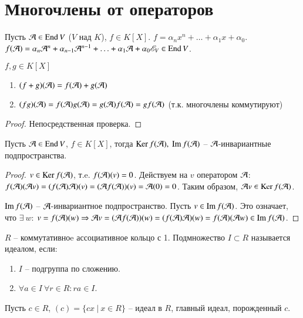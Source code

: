 \documentclass[main]{subfiles}
\begin{document}
\chapter{Многочлены от операторов}

Пусть $\mathcal{A} \in \operatorname{End} V$ ($V$ над $K$), $f \in K[X]$. $f = \alpha_n x^n + \ldots + \alpha_1 x + \alpha_0$.
$f(\mathcal{A}) = \alpha_n  {\mathcal{A}}^n + \alpha_{n-1} {\mathcal{A}}^{n-1} + \ldots + \alpha_1 \mathcal{A} + \alpha_0 \mathscr{E}_V \in \operatorname{End} V$.

\begin{proposition}
    $f, g \in K[X]$
    \begin{enumerate}
        \item $(f+g)(\mathcal{A}) = f(\mathcal{A}) + g(\mathcal{A})$
        \item $(fg)(\mathcal{A}) = f(\mathcal{A})g(\mathcal{A}) =g(\mathcal{A})f(\mathcal{A})=gf(\mathcal{A})$ (т.к. многочлены коммутируют)
    \end{enumerate}
\end{proposition}

\begin{proof}
    Непосредственная проверка.
\end{proof}

\begin{corollary}
    Пусть $\mathcal{A} \in \operatorname{End} V$, $f \in K[X]$, тогда $\operatorname{Ker} f(\mathcal{A}), \ \operatorname{Im} f(\mathcal{A})$ -- $\mathcal{A}$-инвариантные подпространства.
\end{corollary}

\begin{proof}
    $v \in \operatorname{Ker} f(\mathcal{A})$, т.e. $f(\mathcal{A}) (v) = 0$. Действуем на $v$ оператором $\mathcal{A}$: $f(\mathcal{A})(\mathcal{A} v) =
        (f(\mathcal{A})\mathcal{A})(v) = (\mathcal{A} f(\mathcal{A}))(v) = \mathcal{A}(0) = 0$.
    Таким образом, $\mathcal{A} v \in \operatorname{Ker} f(\mathcal{A})$.

    $\operatorname{Im} f(\mathcal{A})$ -- $\mathcal{A}$-инвариантное подпространство.
    Пусть $v \in \operatorname{Im} f(\mathcal{A})$. Это означает, что $\exists \ w$: $v = f(\mathcal{A})(w) \Rightarrow
        \mathcal{A} v = (\mathcal{A} f(\mathcal{A}))(w) = (f(\mathcal{A})\mathcal{A})(w) = f(\mathcal{A})(\mathcal{A} w) \in \operatorname{Im} f(\mathcal{A})$.
\end{proof}

$R$ -- коммутативноe ассоциативное кольцо с 1. Подмножество $I\subset R$ называется идеалом, если:
\begin{enumerate}
    \item $I$ -- подгруппа по сложению.
    \item $\forall a \in I \ \forall r \in R : ra \in I$.
\end{enumerate}

Пусть $c \in R$, $(c) = \{cx  \ | \ x \in R\}$ -- идеал в $R$, главный идеал, порожденный $c$.
\end{document}
